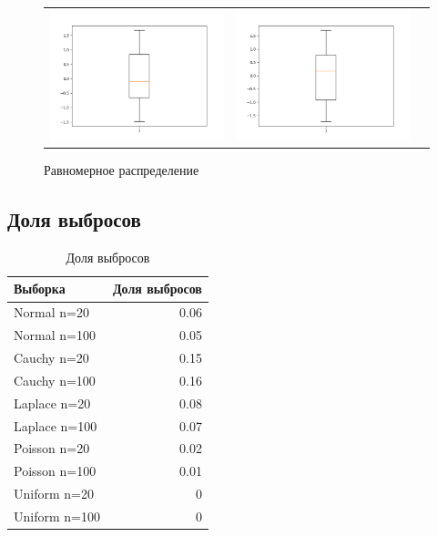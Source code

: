 	\begin{figure}[H]
		\centering
		\begin{tabular}{ccc}
			\includegraphics[width=55mm, height =0.25\textheight]{pics/u20.png}
			&
			\includegraphics[width=55mm, height =0.25\textheight]{pics/u100.png}
		\end{tabular}
		\caption{Равномерное распределение}
		\label{fig:uniform}
	\end{figure}

\subsection{Доля выбросов}
	\begin{table}[H]
		\centering
		\begin{tabular}[t]{lr}
			\hline
			Выборка   &      Доля выбросов		\\
			\hline
			Normal n=20   	&	0.06 				\\
			Normal n=100   	&  	0.05		\\
			Cauchy n=20 	& 	0.15  				\\
			Cauchy n=100	&  	0.16 		\\
			Laplace n=20		& 	0.08  			\\
			Laplace n=100	&  	0.07 		\\
			Poisson n=20	&	0.02 				\\
			Poisson n=100	&	0.01 				\\
			Uniform n=20	&	0 				\\
			Uniform n=100	&	0 				\\
			\hline
		\end{tabular}
		\caption{Доля выбросов}
		\label{tab:normal}
	\end{table}

